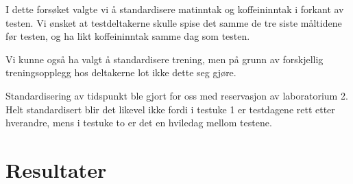 \documentclass[
  letterpaper,
  DIV=11,
  numbers=noendperiod]{scrreprt}
\begin{document}
I dette forsøket valgte vi å standardisere matinntak og koffeininntak i
forkant av testen. Vi ønsket at testdeltakerne skulle spise det samme de
tre siste måltidene før testen, og ha likt koffeininntak samme dag som
testen.

Vi kunne også ha valgt å standardisere trening, men på grunn av
forskjellig treningsopplegg hos deltakerne lot ikke dette seg gjøre.

Standardisering av tidspunkt ble gjort for oss med reservasjon av
laboratorium 2. Helt standardisert blir det likevel ikke fordi i testuke
1 er testdagene rett etter hverandre, mens i testuke to er det en
hviledag mellom testene.

\section{Resultater}\label{resultater}
\end{document}
